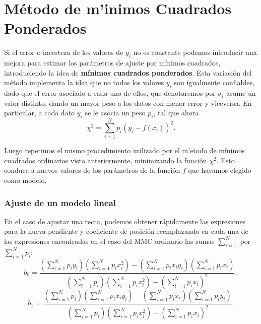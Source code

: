 \section{Método de m'inimos Cuadrados Ponderados}

Si el error o incerteza de los valores de $y_i$ no es constante podemos introducir una mejora para estimar los parámetros de ajuste por mínimos cuadrados, introduciendo la idea de \textbf{mínimos cuadrados ponderados}. Esta variación del método implementa la idea que no todos los valores $y_{i}$ son igualmente confiables, dado que el error asociado a cada uno de ellos, que denotaremos por $\sigma_i$ asume un valor distinto, dando un mayor peso a los datos con menor error y viceversa. En particular, a cada dato $y_i$ se le asocia un peso $p_{i}$, tal que ahora
\begin{equation}
\chi^2=\sum_{i=1}^N p_i\left(y_i-f(x_i)\right)^2.
\end{equation}

Luego repetimos el mismo procedimiento utilizado por el m'etodo de mínimos cuadrados ordinarios visto anteriormente, minimizando la función $\chi^2$. Esto conduce a nuevos valores de los parámetros de la función $f$ que hayamos elegido como modelo. 

\subsubsection{Ajuste de un modelo lineal}
En el caso de ajustar una recta, podemos obtener rápidamente las expresiones para la nueva pendiente y coeficiente de posición reemplazando en cada una de las expresiones encontradas en el caso del MMC ordinario las sumas $\sum_{i=1}^N$ por $\sum_{i=1}^Np_{i}$:
\begin{equation}\label{b0MMCP}
b_0 = \frac{\left(\sum_{i=1}^N p_{i}y_{i}\right)\left(\sum_{i=1}^N p_{i}x_{i}^2\right)-\left(\sum_{i=1}^N p_{i}x_{i} y_{i}\right)\left(\sum_{i=1}^N p_{i}x_{i}\right)}
{\left(\sum_{i=1}^N p_{i}\right)\left(\sum_{i=1}^N p_{i}x_{i}^{2}\right)-\left(\sum_{i=1}^N p_{i}x_{i}\right)^{2}},
\end{equation}
\begin{equation}\label{b1MMCP}
b_1 =  \frac{\left(\sum_{i=1}^N p_{i}\right)\left(\sum_{i=1}^N p_{i}x_{i} y_{i}\right)-\left(\sum_{i=1}^N p_{i}x_{i}\right)\left(\sum_{i=1}^N p_{i}y_{i}\right)}
{\left(\sum_{i=1}^N p_{i}\right)\left(\sum_{i=1}^N p_{i}x_{i}^{2}\right)-\left(\sum_{i=1}^N p_{i}x_{i}\right)^{2}}. 
\end{equation}

